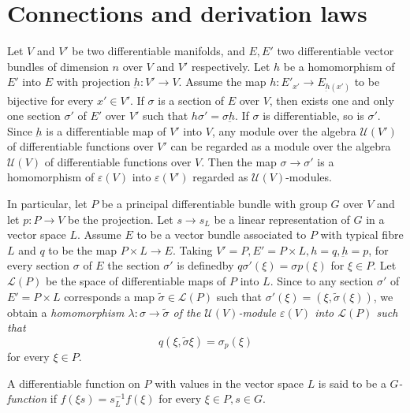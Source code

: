 \section{Connections and derivation laws}\label{chap5:sec6}%

Let $V$ and $V'$ be two differentiable manifolds, and $E, E'$ two
differentiable vector bundles of dimension $n$ over $V$ and $V'$
respectively. Let $h$ be a homomorphism of $E'$ into $E$ with
projection $\underbar{h} : V' \to V$. Assume the map $h : E'_{x'} \to
E_{\underbar{h}(x')}$ to be bijective for every $x' \in V'$. If
$\sigma$ is a section 
 of $E$ over $V$, then exists one and only one section $\sigma '$ of
 $E'$ over $V'$ such that $h \sigma ' = \sigma \underbar{h}$. If
 $\sigma$ is differentiable, so is $\sigma '$. Since $\underbar{h}$ is
 a differentiable map of $V'$ into $V$, any module over the algebra
 $\mathscr{U}(V')$ of differentiable functions over $V'$ can be
 regarded as a module over the algebra $\mathscr{U}(V)$ of
 differentiable functions over $V$. Then the map $\sigma \to \sigma '$
 is a homomorphism of $\varepsilon (V)$ into $\varepsilon (V')$
 regarded as $\mathscr{U}(V)$-modules. 
 
 In particular, let $P$ be a principal differentiable bundle with
 group $G$ over $V$ and let $p : P \to V$ be the projection. Let $s
 \to s_L$ be a linear representation of $G$ in a vector space $L$. 
  Assume $E$ to be a vector bundle associated to $P$ with typical
  fibre $L$ and $q$ to be the map $P \times L \to E$. Taking $V' = P ,
  E' = P \times L, h = q , \underbar{h} = p$, for every section
  $\sigma$ of $E$ the section $\sigma '$ is defined\pageoriginale by $q \sigma
  '(\xi) = \sigma p(\xi)$ for $\xi \in P$. Let $\mathscr{L}(P)$ be
  the space of differentiable maps of $P$ into $L$. Since to any
  section $\sigma '$ of $E' = P \times L$ corresponds a map
  $\tilde{\sigma} \in \mathscr{L} (P)$ such that $\sigma'(\xi) = (\xi
  , \tilde{\sigma}(\xi))$, we obtain a \textit{homomorphism $\lambda :
    \sigma \to \tilde{\sigma}$ of the $\mathscr{U}(V)$-module
    $\varepsilon(V)$ into $\mathscr{L}(P)$ such that} 
  $$
  q(\xi , \tilde{\sigma} \xi) = \sigma_p (\xi)
  $$
  for every $\xi \in P$.

\begin{defn}\label{chap5:sec6:def4}%
  A differentiable function on $P$ with values in the vector space $L$
  is said to be a \textit{$G$-function} if $f(\xi s) = s^{-1}_L
  f(\xi)$ for every $\xi \in P, s \in G$. 
\end{defn}


